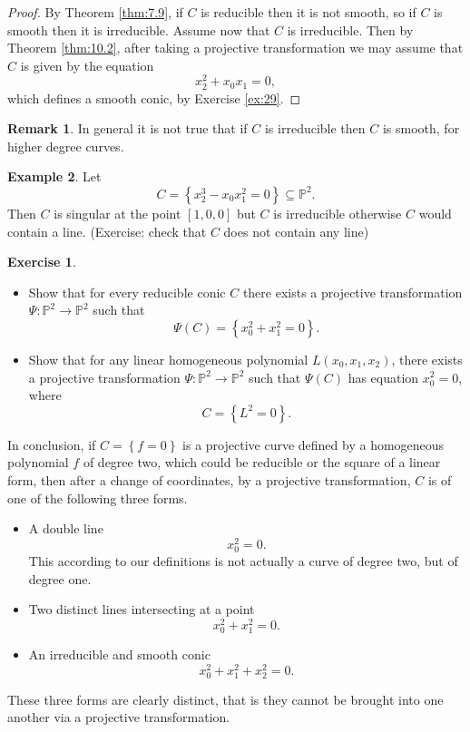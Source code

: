 \documentclass{article}
\renewcommand{\P}{\mathbb{P}}
\newcommand{\rb}[1]{\left( #1 \right)}
\renewcommand{\sb}[1]{\left[ #1 \right]}
\newcommand{\cb}[1]{\left\{ #1 \right\}}
\theoremstyle{definition}\newtheorem{definition}{Definition}[section]
\theoremstyle{definition}\newtheorem{notation}[definition]{Notation}
\theoremstyle{definition}\newtheorem{remark}[definition]{Remark}
\theoremstyle{definition}\newtheorem{example1}[definition]{Example}
\theoremstyle{definition}\newtheorem{fact}{Fact}
\theoremstyle{definition}\newtheorem{exercise}{Exercise}
\theoremstyle{definition}\newtheorem*{example2}{Example}
\begin{document}
\begin{proof}
By Theorem \ref{thm:7.9}, if $ C $ is reducible then it is not smooth, so if $ C $ is smooth then it is irreducible. Assume now that $ C $ is irreducible. Then by Theorem \ref{thm:10.2}, after taking a projective transformation we may assume that $ C $ is given by the equation
$$ x_2^2 + x_0x_1 = 0, $$
which defines a smooth conic, by Exercise \ref{ex:29}.
\end{proof}

\begin{remark}
In general it is not true that if $ C $ is irreducible then $ C $ is smooth, for higher degree curves.
\end{remark}

\begin{example1}
Let
$$ C = \cb{x_2^3 - x_0x_1^2 = 0} \subseteq \P^2. $$
Then $ C $ is singular at the point $ \sb{1, 0, 0} $ but $ C $ is irreducible otherwise $ C $ would contain a line. (Exercise: check that $ C $ does not contain any line)
\end{example1}

\begin{exercise}
\label{ex:30}
\hfill
\begin{itemize}
\item Show that for every reducible conic $ C $ there exists a projective transformation $ \Psi : \P^2 \to \P^2 $ such that
$$ \Psi\rb{C} = \cb{x_0^2 + x_1^2 = 0}. $$
\item Show that for any linear homogeneous polynomial $ L\rb{x_0, x_1, x_2} $, there exists a projective transformation $ \Psi : \P^2 \to \P^2 $ such that $ \Psi\rb{C} $ has equation $ x_0^2 = 0 $, where
$$ C = \cb{L^2 = 0}. $$
\end{itemize}
\end{exercise}

In conclusion, if $ C = \cb{f = 0} $ is a projective curve defined by a homogeneous polynomial $ f $ of degree two, which could be reducible or the square of a linear form, then after a change of coordinates, by a projective transformation, $ C $ is of one of the following three forms.
\begin{itemize}
\item A double line
$$ x_0^2 = 0. $$
This according to our definitions is not actually a curve of degree two, but of degree one.
\item Two distinct lines intersecting at a point
$$ x_0^2 + x_1^2 = 0. $$
\item An irreducible and smooth conic
$$ x_0^2 + x_1^2 + x_2^2 = 0. $$
\end{itemize}
These three forms are clearly distinct, that is they cannot be brought into one another via a projective transformation.
\end{document}
